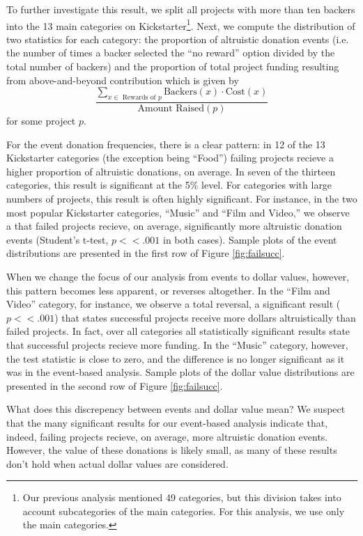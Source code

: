 \documentclass[letterpaper]{article}
\begin{document}
To further investigate this result, we split all projects with more than ten backers into the 13 main categories on Kickstarter\footnote{Our previous analysis mentioned 49 categories, but this division takes into account subcategories of the main categories. For this analysis, we use only the main categories.}. Next, we compute the distribution of two statistics for each category: the proportion of altruistic donation events (i.e. the number of times a backer selected the ``no reward'' option divided by the total number of backers) and the proportion of total project funding resulting from above-and-beyond contribution which is given by
\begin{equation} \label{eq:altruism}
\frac{\sum\limits_{x \in \text{ Rewards of $p$}} \text{Backers}(x) \cdot \text{Cost}(x)}
{\text{Amount Raised}(p)}
\end{equation}
for some project $p$.

For the event donation frequencies, there is a clear pattern: in 12 of the 13 Kickstarter categories (the exception being ``Food'') failing projects recieve a higher proportion of altruistic donations, on average. In seven of the thirteen categories, this result is significant at the 5\% level. For categories with large numbers of projects, this result is often highly significant. For instance, in the two most popular Kickstarter categories, ``Music'' and ``Film and Video,'' we observe a that failed projects recieve, on average, significantly more altruistic donation events (Student's t-test, $p<<.001$ in both cases). Sample plots of the event distributions are presented in the first row of Figure \ref{fig:failsucc}.

When we change the focus of our analysis from events to dollar values, however, this pattern becomes less apparent, or reverses altogether. In the ``Film and Video'' category, for instance, we observe a total reversal, a significant result ($p << .001$) that states successful projects receive more dollars altruistically than failed projects. In fact, over all categories all statistically significant results state that successful projects recieve more funding. In the ``Music'' category, however, the test statistic is close to zero, and the difference is no longer significant as it was in the event-based analysis. Sample plots of the dollar value distributions are presented in the second row of Figure \ref{fig:failsucc}.

What does this discrepency between events and dollar value mean? We suspect that the many significant results for our event-based analysis indicate that, indeed, failing projects recieve, on average, more altruistic donation events. However, the value of these donations is likely small, as many of these results don't hold when actual dollar values are considered.
\end{document}

